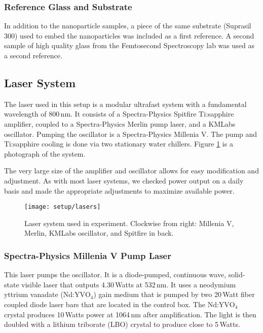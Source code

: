 \subsubsection{Reference Glass and Substrate}\label{chap_setup_glass}
In addition to the nanoparticle samples, a piece of the same substrate (Suprasil 300) used to embed the nanoparticles was included as a first reference. A second sample of high quality glass from the Femtosecond Spectroscopy lab was used as a second reference.

\subsection{Laser System}\label{chap_setup_laser}
The laser used in this setup is a modular ultrafast system with a fundamental wavelength of 800\,nm. It consists of a Spectra-Physics Spitfire Ti:sapphire amplifier, coupled to a Spectra-Physics Merlin pump laser, and a KMLabs oscillator. Pumping the oscillator is a Spectra-Physics Millenia V. The pump and Ti:sapphire cooling is done via two stationary water chillers. Figure \ref{fig_lasers} is a photograph of the system.

The very large size of the amplifier and oscillator allows for easy modification and adjustment. As with most laser systems, we checked power output on a daily basis and  made the appropriate adjustments to maximize available power.

\begin{figure}[h]
\centering
\texttt{[image: setup/lasers]}
\caption[Laser system used in experiment.]{Laser system used in experiment. Clockwise from right: Millenia V, Merlin, KMLabs oscillator, and Spitfire in back.\label{fig_lasers}}
\end{figure}

\subsubsection{Spectra-Physics Millenia V Pump Laser}
This laser pumps the oscillator. It is a diode-pumped, continuous wave, solid-state visible laser that outputs 4.30\,Watts at 532\,nm. It uses a neodymium yttrium vanadate (Nd:YV$\text{O}_{4}$) gain medium that is pumped by two 20\,Watt fiber coupled diode laser bars that are located in the control box. The Nd:YV$\text{O}_{4}$ crystal produces 10\,Watts power at 1064\,nm after amplification. The light is then doubled with a lithium triborate (LBO) crystal to produce close to 5\,Watts.


